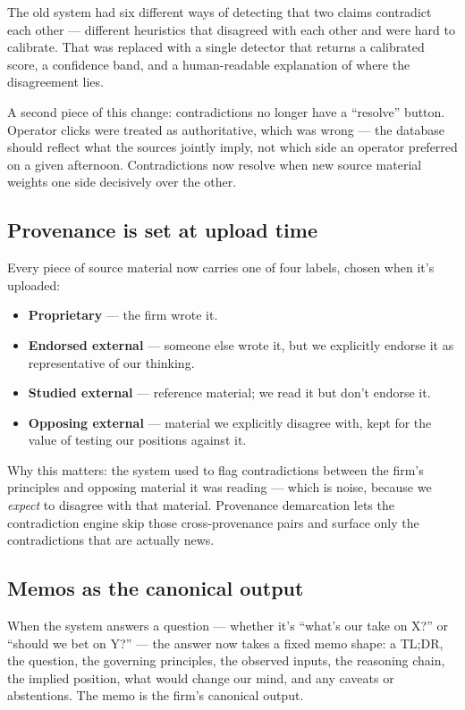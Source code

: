\documentclass[11pt]{article}
\begin{document}
The old system had six different ways of detecting that two
claims contradict each other — different heuristics that
disagreed with each other and were hard to calibrate. That was
replaced with a single detector that returns a calibrated score,
a confidence band, and a human-readable explanation of where the
disagreement lies.

A second piece of this change: contradictions no longer have a
``resolve'' button. Operator clicks were treated as authoritative,
which was wrong — the database should reflect what the sources
jointly imply, not which side an operator preferred on a given
afternoon. Contradictions now resolve when new source material
weights one side decisively over the other.

\subsection{Provenance is set at upload time}

Every piece of source material now carries one of four labels,
chosen when it's uploaded:

\begin{itemize}[leftmargin=*]
  \item \textbf{Proprietary} — the firm wrote it.
  \item \textbf{Endorsed external} — someone else wrote it, but we
        explicitly endorse it as representative of our thinking.
  \item \textbf{Studied external} — reference material; we read it
        but don't endorse it.
  \item \textbf{Opposing external} — material we explicitly
        disagree with, kept for the value of testing our positions
        against it.
\end{itemize}

Why this matters: the system used to flag contradictions between
the firm's principles and opposing material it was reading — which
is noise, because we \emph{expect} to disagree with that material.
Provenance demarcation lets the contradiction engine skip those
cross-provenance pairs and surface only the contradictions that
are actually news.

\subsection{Memos as the canonical output}

When the system answers a question — whether it's ``what's our
take on X?'' or ``should we bet on Y?'' — the answer now takes a
fixed memo shape: a TL;DR, the question, the governing principles,
the observed inputs, the reasoning chain, the implied position,
what would change our mind, and any caveats or abstentions. The
memo is the firm's canonical output.
\end{document}
